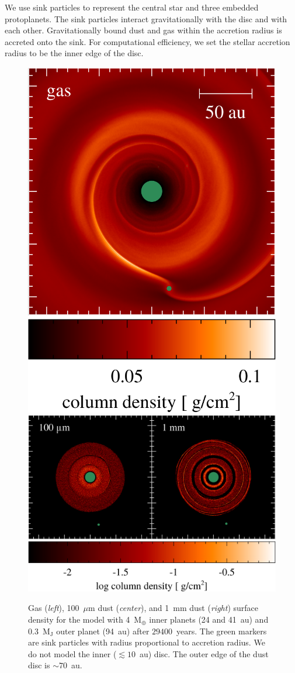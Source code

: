 \documentclass[usenatbib,a4paper,times]{mnras}
\renewcommand{\earth}{\mathrm{M}_{\oplus}}
\begin{document}
We use sink particles \citep{bate:1995} to represent the central star and three
embedded protoplanets. The sink particles interact gravitationally with the disc
and with each other. Gravitationally bound dust and gas within the accretion
radius is accreted onto the sink. For computational efficiency, we set the
stellar accretion radius to be the inner edge of the disc.

\begin{figure}
   \begin{center}
      \includegraphics[height=0.460\columnwidth]{figs/gas.pdf}
      \includegraphics[height=0.460\columnwidth]{figs/dust.pdf}
      \caption{Gas (\textit{left}), 100~$\mu$m dust (\textit{center}), and 1~mm
         dust (\textit{right}) surface density for the model with 4~$\earth{}$
         inner planets (24 and 41~au) and 0.3~$\mathrm{M_J}$ outer planet
         (94~au) after $29400$~years. The green markers are sink particles with
         radius proportional to accretion radius. We do not model the inner
         ($\lesssim 10$~au) disc. The outer edge of the dust disc is $\sim
         70$~au.\label{fig:surface-density}}
   \end{center}
\end{figure}
\end{document}
